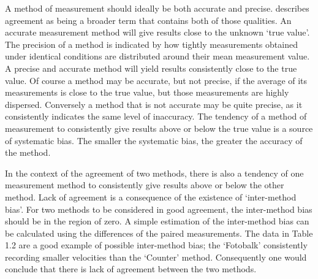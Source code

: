 \documentclass[12pt, a4paper]{report}
\theoremstyle{plain}
\theoremstyle{definition}
\theoremstyle{remark}
\begin{document}
	
	A method of measurement should ideally be both accurate and precise. \citet{Barnhart} describes agreement as being a broader term that contains both of those qualities. An accurate measurement method will give results close to the unknown `true value'. The precision of a method is indicated by how tightly measurements obtained under identical conditions are distributed around their mean measurement value. A precise and accurate method
	will yield results consistently close to the true value. Of course 	a method may be accurate, but not precise, if the average of its measurements is close to the true value, but those measurements
	are highly dispersed. Conversely a method that is not accurate may be quite precise, as it consistently indicates the same level of inaccuracy. The tendency of a method of measurement to consistently give results above or below the true value is a source of systematic bias. The smaller the systematic bias, the
	greater the accuracy of the method.
	
	
	In the context of the agreement of two methods, there is also a tendency of one measurement method to consistently give results above or below the other method. Lack of agreement is a consequence of the existence of `inter-method bias'. For two methods to be considered in good agreement, the inter-method bias should be in the region of zero. A simple estimation of the inter-method bias can be calculated using the differences of the
	paired measurements. The data in Table 1.2 are a good example of
	possible inter-method bias; the `Fotobalk' consistently recording
	smaller velocities than the `Counter' method. Consequently one
	would conclude that there is lack of agreement between the two
	methods.
	
	
	\newpage
\end{document}
